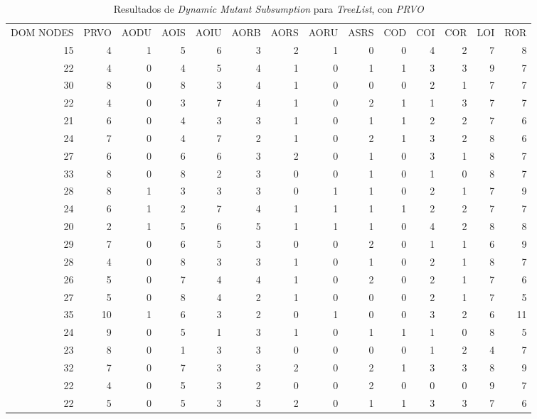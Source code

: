 \begin{table}[]
	\caption[\emph{Dynamic Mutant Subsumption} \emph{TreeList}, con \emph{PRVO}]{Resultados de \emph{Dynamic Mutant Subsumption} para \emph{TreeList}, con \emph{PRVO}}
	\label{tables.results.subsumption.treelist.prvo}
	\centering
	\scriptsize
	\def\arraystretch{0.95}
	\setlength\tabcolsep{0.5mm}
	\begin{tabular}{rrrrrrrrrrrrrr}
		DOM NODES & PRVO & AODU & AOIS & AOIU & AORB & AORS & AORU & ASRS & COD & COI & COR & LOI & ROR \\
		15 & 4 & 1 & 5 & 6 & 3 & 2 & 1 & 0 & 0 & 4 & 2 & 7 & 8 \\
		22 & 4 & 0 & 4 & 5 & 4 & 1 & 0 & 1 & 1 & 3 & 3 & 9 & 7 \\
		30 & 8 & 0 & 8 & 3 & 4 & 1 & 0 & 0 & 0 & 2 & 1 & 7 & 7 \\
		22 & 4 & 0 & 3 & 7 & 4 & 1 & 0 & 2 & 1 & 1 & 3 & 7 & 7 \\
		21 & 6 & 0 & 4 & 3 & 3 & 1 & 0 & 1 & 1 & 2 & 2 & 7 & 6 \\
		24 & 7 & 0 & 4 & 7 & 2 & 1 & 0 & 2 & 1 & 3 & 2 & 8 & 6 \\
		27 & 6 & 0 & 6 & 6 & 3 & 2 & 0 & 1 & 0 & 3 & 1 & 8 & 7 \\
		33 & 8 & 0 & 8 & 2 & 3 & 0 & 0 & 1 & 0 & 1 & 0 & 8 & 7 \\
		28 & 8 & 1 & 3 & 3 & 3 & 0 & 1 & 1 & 0 & 2 & 1 & 7 & 9 \\
		24 & 6 & 1 & 2 & 7 & 4 & 1 & 1 & 1 & 1 & 2 & 2 & 7 & 7 \\
		20 & 2 & 1 & 5 & 6 & 5 & 1 & 1 & 1 & 0 & 4 & 2 & 8 & 8 \\
		29 & 7 & 0 & 6 & 5 & 3 & 0 & 0 & 2 & 0 & 1 & 1 & 6 & 9 \\
		28 & 4 & 0 & 8 & 3 & 3 & 1 & 0 & 1 & 0 & 2 & 1 & 8 & 7 \\
		26 & 5 & 0 & 7 & 4 & 4 & 1 & 0 & 2 & 0 & 2 & 1 & 7 & 6 \\
		27 & 5 & 0 & 8 & 4 & 2 & 1 & 0 & 0 & 0 & 2 & 1 & 7 & 5 \\
		35 & 10 & 1 & 6 & 3 & 2 & 0 & 1 & 0 & 0 & 3 & 2 & 6 & 11 \\
		24 & 9 & 0 & 5 & 1 & 3 & 1 & 0 & 1 & 1 & 1 & 0 & 8 & 5 \\
		23 & 8 & 0 & 1 & 3 & 3 & 0 & 0 & 0 & 0 & 1 & 2 & 4 & 7 \\
		32 & 7 & 0 & 7 & 3 & 3 & 2 & 0 & 2 & 1 & 3 & 3 & 8 & 9 \\
		22 & 4 & 0 & 5 & 3 & 2 & 0 & 0 & 2 & 0 & 0 & 0 & 9 & 7 \\
		22 & 5 & 0 & 5 & 3 & 3 & 2 & 0 & 1 & 1 & 3 & 3 & 7 & 6 \\

\end{tabular}
\end{table}
